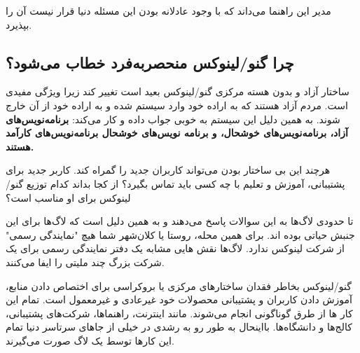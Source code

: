 \begin{note}
مدیر این راهنما می‌داند که با وجود عادلانه بودن این مسئله دنیا قرار نیست آن را بپذیرد.
\end{note}

\subsection{چرا گنو/لینوکس منحصربه‌فرد خطاب می‌شود؟}

ساختار آزاد و بدون هسته مرکزی گنو/لینوکس بعید است تغییر کند زیرا ویژگی مفیدی است.
مردم آزاد هستند که به اراده خود وارد سیستم شده و به اراده خود از آن خارج شوند.
به همین دلیل این سیستم به خوبی جواب داده و کار می‌کند:
{\bfseries
برنامه‌نویس‌های آزاد، برنامه‌نویس‌های خوشحال، و برنامه نویس‌های خوشحال برنامه‌نویس‌های کارآمد هستند.
}

هرچند این بی ساختار بودن می‌تواند کاربران جدید را گمراه کند.
کاربر جدید برای پشتیبانی، آموزش و تعلیم با چه کسی باید تماس بگیرد؟
از کجا بداند کدام توزیع گنو/لینوکس برای او مناسب است؟

تا حدودی لاگ‌ها به این سوالات پاسخ می‌دهند و به همین دلیل است که لاگ‌ها برای این جنبش حیاتی بوده اند.
برای همین محله، روستا یا کلان‌شهر شما هیچ "نمایندگی رسمی" از شرکت لینوکس ندارد.
لاگ‌ها نقش هایی مشابه یک دفتر نمایندگی رسمی برای یک شرکت بزرگ چند ملیتی را ایفا می‌کنند.

گنو/لینوکس بخاطر فقدان ساختار‌های مرکزی یا بروکراسی برای اختصاص دادن منابع،
آموزش دادن کاربران و پشتیبانی محصولات خود غیرعادی و غیرمعمول است. تمام این کار ها
از طرق گوناگونی انجام می‌شوند. مانند اینترنت، راهنماها،
شرکت‌های پشتیبانی، کالج‌ها و دانشگاه‌ها. بااینحال به طور رو به رشدی در خیلی از جاهای
سرتاسر دنیا تمام این کارها توسط یک لاگ صورت می‌گیرند.


